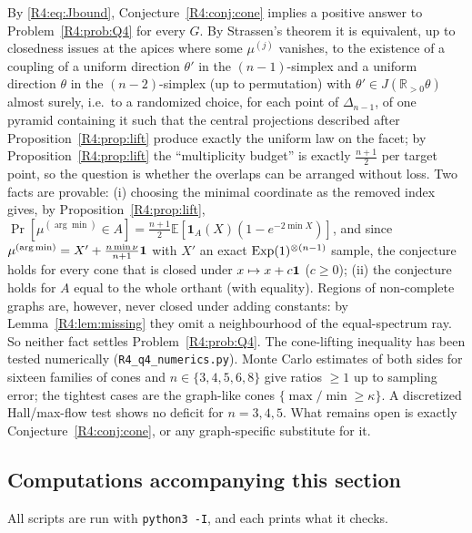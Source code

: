 \documentclass[11pt]{amsart}
\theoremstyle{definition}
\theoremstyle{remark}
\providecommand{\R}{\mathbb R}
\begin{document}
By \eqref{R4:eq:Jbound}, Conjecture~\ref{R4:conj:cone} implies a positive
answer to Problem~\ref{R4:prob:Q4} for every $G$.  By Strassen's theorem
\cite{R4-Strassen} it is equivalent, up to closedness issues at the
apices where some $\mu^{(j)}$ vanishes, to the existence of a coupling of a uniform direction
$\theta'$ in the $(n-1)$-simplex and a uniform direction $\theta$ in the
$(n-2)$-simplex (up to permutation) with $\theta'\in J(\R_{>0}\theta)$
almost surely, i.e.\ to a randomized choice, for each point of
$\Delta_{n-1}$, of one pyramid containing it such that the central
projections described after Proposition~\ref{R4:prop:lift} produce exactly
the uniform law on the facet; by
Proposition~\ref{R4:prop:lift} the ``multiplicity budget'' is exactly
$\frac{n+1}2$ per target point, so the question is whether the overlaps
can be arranged without loss.  Two facts are provable: (i) choosing the
minimal coordinate as the removed index gives, by
Proposition~\ref{R4:prop:lift}, $\Pr[\mu^{(\arg\min)}\in A]=\frac{n+1}{2}
\mathbb E[\mathbf 1_A(X)(1-e^{-2\min X})]$, and since
$\mu^{(\arg\min)}=X'+\frac{n\min\nu}{n+1}\mathbf{1}$ with $X'$ an exact
$\operatorname{Exp}(1)^{\otimes(n-1)}$ sample, the conjecture holds for every cone that
is closed under $x\mapsto x+c\mathbf{1}$ ($c\ge0$); (ii) the conjecture holds for
$A$ equal to the whole orthant (with equality).  Regions of non-complete
graphs are, however, never closed under adding constants: by
Lemma~\ref{R4:lem:missing} they omit a neighbourhood of the
equal-spectrum ray.  So neither fact settles Problem~\ref{R4:prob:Q4}.
The cone-lifting inequality has been tested numerically
(\texttt{R4\_\allowbreak{}q4\_\allowbreak{}numerics.py}).  Monte Carlo estimates of both sides for
sixteen families of cones and $n\in\{3,4,5,6,8\}$ give ratios $\ge1$ up
to sampling error; the tightest cases are the graph-like cones
$\{\max/\min\ge\kappa\}$.  A discretized Hall/max-flow test shows no
deficit for $n=3,4,5$.  What remains open is exactly
Conjecture~\ref{R4:conj:cone}, or any graph-specific substitute for it.

\subsection{Computations accompanying this section}
\label{R4:subsec:computations}

All scripts are run with \texttt{python3 -I}, and each prints what it
checks.
\end{document}
